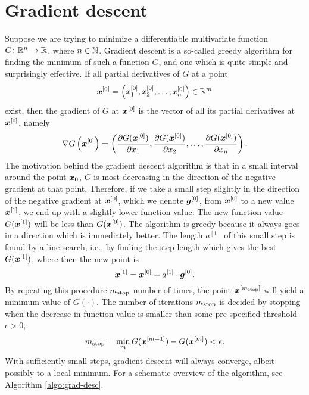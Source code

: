 \section{Gradient descent}
Suppose we are trying to minimize a differentiable multivariate function $G\colon\mathbb{R}^n\to\mathbb{R}$, where $n\in\mathbb{N}$.
Gradient descent is a so-called greedy algorithm for finding the minimum of such a function $G$, and one which is quite simple and surprisingly effective.
If all partial derivatives of $G$ at a point
\begin{equation*}
    \bm{x}^{[0]}=\left(x_1^{[0]},x_2^{[0]},\ldots,x_n^{[0]}\right)\in\mathbb{R}^m
\end{equation*}
exist, then the gradient of $G$ at $\bm{x}^{[0]}$ is the vector of all its partial derivatives at $\bm{x}^{[0]}$, namely
\begin{equation*}
    \nabla G\left(\bm{x}^{[0]}\right)=\left(\frac{\partial G(\bm{x}^{[0]})}{\partial x_1},\frac{\partial G(\bm{x}^{[0]})}{\partial x_2},\ldots,\frac{\partial G(\bm{x}^{[0]})}{\partial x_n}\right).
\end{equation*}
The motivation behind the gradient descent algorithm is that in a small interval around the point $\bm{x}_0$, $G$ is most decreasing in the direction of the negative gradient at that point.
Therefore, if we take a small step slightly in the direction of the negative gradient at $\bm{x}^{[0]}$, which we denote $\bm{g}^{[0]}$, from $\bm{x}^{[0]}$ to a new value $\bm{x}^{[1]}$, we end up with a slightly lower function value:
The new function value $G(\bm{x}^{[1]})$ will be less than $G(\bm{x}^{[0]})$.
The algorithm is greedy because it always goes in a direction which is immediately better.
The length $a^{[1]}$ of this small step is found by a line search, i.e., by finding the step length which gives the best $G(\bm{x}^{[1]})$, where then the new point is
\begin{equation*}
    \bm{x}^{[1]}=\bm{x}^{[0]}+a^{[1]}\cdot\boldsymbol{g}^{[0]}.
\end{equation*}
By repeating this procedure $m_{\text{stop}}$ number of times, the point $\bm{x}^{[m_{\text{stop}}]}$ will yield a minimum value of $G(\cdot)$.
The number of iterations $m_{\text{stop}}$ is decided by stopping when the decrease in function value is smaller than some pre-specified threshold $\epsilon>0$,
\begin{equation*}
    m_{\text{stop}}=\min_m G(\bm{x}^{[m-1]})-G(\bm{x}^{[m]})<\epsilon.
\end{equation*}
With sufficiently small steps, gradient descent will always converge, albeit possibly to a local minimum.
For a schematic overview of the algorithm, see Algorithm \ref{algo:grad-desc}.

